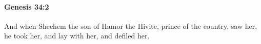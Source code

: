 
		\paragraph{Genesis 34:2} %
			\label{GENESIS-34-2}

			And when Shechem the son of Hamor the Hivite, prince of the country, saw her, he took her, and lay with her, and defiled her.



